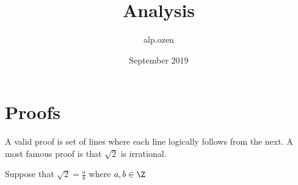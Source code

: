 \documentclass{article}
\title{Analysis}
\author{alp.ozen}
\date{September 2019}
\begin{document}
\maketitle

\section{Proofs}
A valid proof is set of lines where each line logically follows from the next. 
A most famous proof is that $\sqrt{2} $ is irrational. 

\begin{tcolorbox}
	Suppose that $\sqrt{2} = \frac{a}{b}$ where $a,b \in \Z$  
\end{tcolorbox}
\end{document}
